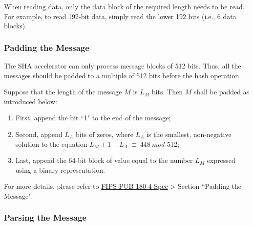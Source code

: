 \documentclass[main\_\_EN.tex]{subfiles}
\begin{document}
\begin{tiplisting}
When reading data, only the data block of the required length needs to be read. For example, to read 192-bit data, simply read the lower 192 bits (i.e., 6 data blocks).
\end{tiplisting}

\subsubsection{Padding the Message}\label{sec:ecdsa-msg-padding}

The SHA accelerator can only process message blocks of 512 bits. Thus, all the messages should be padded to a multiple of 512 bits before the hash operation.

Suppose that the length of the message \begin{math}M\end{math} is \begin{math} L_M \end{math} bits. Then \begin{math} M \end{math} shall be padded as introduced below:

\begin{enumerate}
    \item First, append the bit ``1" to the end of the message;
    \item Second, append \begin{math} L_A \end{math} bits of zeros, where \begin{math} L_A \end{math} is the smallest, non-negative solution to the equation \begin{math}L_M + 1 + L_A \ {\equiv} \ 448 \ mod \end{math} 512;
    \item Last, append the 64-bit block of value equal to the number \begin{math} L_M \end{math} expressed using a binary representation.
\end{enumerate}

For more details, please refer to \href{https://doi.org/10.6028/NIST.FIPS.180-4}{FIPS PUB 180-4 Spec} > Section ``Padding the Message".

\subsubsection{Parsing the Message}\label{sec:ecdsa-msg-parsing}
\end{document}
